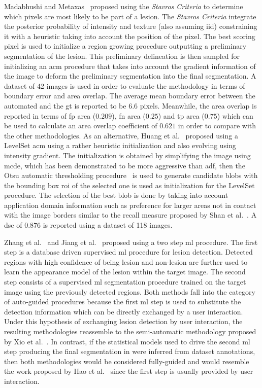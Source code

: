 \documentclass[authoryear,preprint,review,12pt]{elsarticle}
\begin{document}
Madabhushi and Metaxas~\cite{Madabhushi:2003p6036} proposed using the \emph{Stavros Criteria} \cite{stavros2004breast} to determine which pixels are most likely to be part of a lesion. The \emph{Stavros Criteria} integrate the posterior probability of intensity and texture (also assuming \ac{iid}) constraining it with a heuristic taking into account the position of the pixel. The best scoring pixel is used to initialize a region growing procedure outputting a preliminary segmentation of the lesion. This preliminary delineation is then sampled for initializing an \ac{acm} procedure that takes into account the gradient information of the image to deform the preliminary segmentation into the final segmentation. A dataset of 42 images is used in order to evaluate the methodology in terms of boundary error and area overlap. The average mean boundary error between the automated and the \ac{gt} is reported to be $6.6$ pixels. Meanwhile, the area overlap is reported in terms of \ac{fp} area ($0.209$), \ac{fn} area ($0.25$) and \ac{tp} area ($0.75$) which can be used to calculate an area overlap coefficient of $0.621$ in order to compare with the other methodologies.
As an alternative, Huang et al.~\cite{Huang:2007p6100} proposed using a LevelSet \ac{acm} using a rather heuristic initialization and also evolving using intensity gradient. The initialization is obtained by simplifying the image using \ac{mcde}, which has been demonstrated to be more aggressive than \ac{adf}, then the Otsu automatic thresholding procedure~\cite{otsu1975threshold} is used to generate candidate blobs with the bounding box \ac{roi} of the selected one is used as initialization for the LevelSet procedure. The selection of the best blob is done by taking into account application domain information such as preference for larger areas not in contact with the image borders similar to the recall measure proposed by Shan et al.~\cite{Shan:2008p10923}. A \ac{dsc} of $0.876$ is reported using a dataset of 118 images. 

Zhang et al.~\cite{Zhang:2010p14317} and Jiang et al.~\cite{Jiang:2012p14354} proposed using a two step \ac{ml} procedure. The first step is a database driven supervised \ac{ml} procedure for lesion detection. Detected regions with high confidence of being lesion and non-lesion are further used to learn the appearance model of  the lesion within the target image. The second step consists of a supervised \ac{ml} segmentation procedure trained on the target image using the previously detected regions. Both methods fall into the category of auto-guided procedures because the first \ac{ml} step is used to substitute the detection information which can be directly exchanged by a user interaction. Under this hypothesis of exchanging lesion detection by user interaction, the resulting methodologies reassemble to the semi-automatic methodology proposed by Xio et al.~\cite{Xiao:2002p5639}. In contrast, if the statistical models used to drive the second \ac{ml} step producing the final segmentation in \cite{Zhang:2010p14317,Jiang:2012p14354} were inferred from dataset annotations, then both methodologies would be considered fully-guided and would resemble the work proposed by Hao et al.~\cite{hao2012combining} 
since the first step is usually provided by user interaction. 
\end{document}
